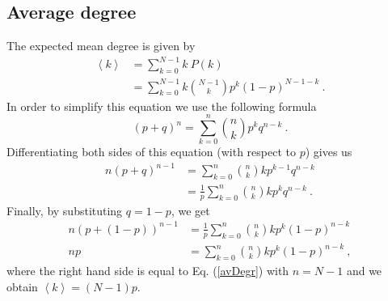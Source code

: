 \documentclass[11 pt , letterpaper , twoside , openright]{book}
\begin{document}
\subsection{Average degree}\label{degree}
The expected mean degree is given by \cite{Hopcroft2006}
\begin{equation}\label{avDegr}
\begin{split}
	\left<k\right> &= \sum_{k=0}^{N-1} k\  P(k)  \\
&= \sum_{k=0}^{N-1} k \binom{N-1}{k}p^k (1-p)^{N-1-k} \ .
\end{split}
\end{equation}
In order to simplify this equation we use the following formula \cite{Hopcroft2006}
\begin{equation} 
	(p+q)^n = \sum_{k=0}^n \binom{n}{k} p^k q^{n-k} \ .
\end{equation}
Differentiating both sides of this equation (with respect to $p$) gives us \cite{Hopcroft2006}
\begin{equation}
\begin{split}
	n(p+q)^{n-1} &= \sum_{k=0}^n \binom{n}{k} k p^{k-1} q^{n-k} \\
	&= \frac{1}{p} \sum_{k=0}^n \binom{n}{k} k p^{k} q^{n-k} \ .
\end{split}
\end{equation}
Finally, by substituting $q = 1-p$, we get \cite{Hopcroft2006}
\begin{equation}
\begin{split}
	n (p+(1-p))^{n-1} &= \frac{1}{p} \sum_{k=0}^n \binom{n}{k} k p^{k} (1-p)^{n-k} \\
	np &= \sum_{k=0}^n \binom{n}{k} k p^{k} (1-p)^{n-k} \ ,
\end{split}
\end{equation}
where the right hand side is equal to Eq. (\ref{avDegr}) with $n = N-1$ and we obtain $\left<k\right> = (N-1)p$.
\end{document}
